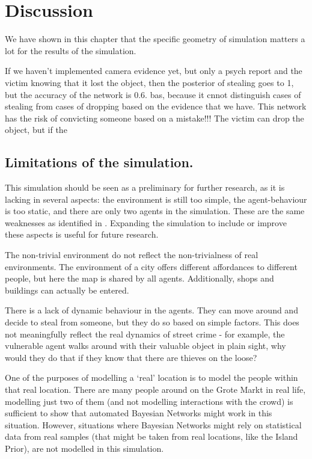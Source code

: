 \section{Discussion}
We have shown in this chapter that the specific geometry of simulation matters a lot for the results of the simulation. 

If we haven't implemented camera evidence yet, but only a psych report and the victim knowing that it lost the object, then the posterior of stealing goes to 1, but the accuracy of the network is 0.6. bas, because it cnnot distinguish cases of stealing from cases of dropping based on the evidence that we have.
This network has the risk of convicting someone based on a mistake!!! The victim can drop the object, but if the 

\subsection{Limitations of the simulation.}
This simulation should be seen as a preliminary for further research, as it is lacking in several aspects: the environment is still too simple, the agent-behaviour is too static, and there are only two agents in the simulation. These are the same weaknesses as identified in \citep{Zhu2021}. Expanding the simulation to include or improve these aspects is useful for future research.

The non-trivial environment do not reflect the non-trivialness of real environments. The environment of a city offers different affordances to different people, but here the map is shared by all agents. Additionally, shops and buildings can actually be entered.

There is a lack of dynamic behaviour in the agents. They can move around and decide to steal from someone, but they do so based on simple factors. This does not meaningfully reflect the real dynamics of street crime - for example, the vulnerable agent walks around with their valuable object in plain sight, why would they do that if they know that there are thieves on the loose?

One of the purposes of modelling a `real' location is to model the people within that real location. There are many people around on the Grote Markt in real life, modelling just two of them (and not modelling interactions with the crowd) is sufficient to show that automated Bayesian Networks might work in this situation. However, situations where Bayesian Networks might rely on statistical data from real samples (that might be taken from real locations, like the Island Prior), are not modelled in this simulation. 


